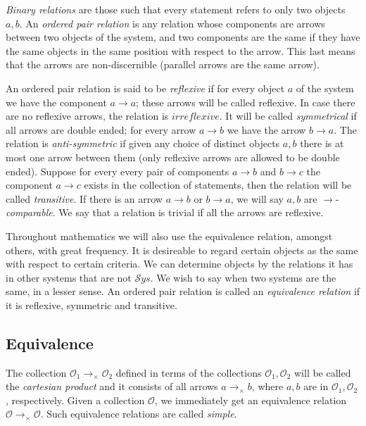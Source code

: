 \documentclass [12pt]{book}
\begin{document}
\textit{Binary relations} are those such that every statement refers to only two objects $a,b$. An \textit{ordered pair relation} is any relation whose components are arrows between two objects of the system, and two components are the same if they have the same objects in the same position with respect to the arrow. This last means that the arrows are non-discernible (parallel arrows are the same arrow).

An ordered pair relation is said to be \textit{reflexive} if for every object $a$ of the system we have the component $a\rightarrow a$; these arrows will be called reflexive. In case there are no reflexive arrows, the relation is $irreflexive$. It will be called \textit{symmetrical} if all arrows are double ended; for every arrow $a\rightarrow b$ we have the arrow $b\rightarrow a$. The relation is \textit{anti-symmetric} if given any  choice of distinct objects $a,b$ there is at most one arrow between them (only reflexive arrows are allowed to be double ended). Suppose for every every pair of components $a\rightarrow b$ and $b\rightarrow c$ the component $a\rightarrow c$ exists in the collection of statements, then the relation will be called \textit{transitive}. If there is an arrow $a\rightarrow b$ or $b\rightarrow a$, we will say $a,b$ are $\rightarrow$-\textit{comparable}. We say that a relation is trivial if all the arrows are reflexive.

Throughout mathematics we will also use the equivalence relation, amongst others, with great frequency. It is desireable to regard certain objects as the same with respect to certain criteria. We can determine objects by the relations it has in other systems that are not $\mathcal{S}ys$. We wish to say when two systems are the same, in a lesser sense. An ordered pair relation is called an \textit{equivalence relation} if it is reflexive, symmetric and transitive.

		\subsection{Equivalence}

The collection $\mathcal{O}_{1}\rightarrow_{\times}\mathcal{O}_{2}$ defined in terms of the collections $\mathcal{O}_{1},\mathcal{O}_{2}$ will be called the \textit{cartesian product} and it consists of all arrows $a\rightarrow_{\times}b$, where $a,b$ are in $\mathcal{O}_{1},\mathcal{O}_{2}$, respectively. Given a collection $\mathcal{O}$, we immediately get an equivalence relation $\mathcal{O}\rightarrow_{\times}\mathcal{O}$. Such equivalence relations are called \textit{simple}.
\end{document}

